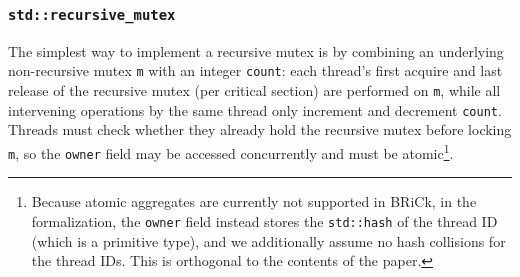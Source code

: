 \subsubsection{\lstinline{std::recursive_mutex}}

The simplest way to implement a recursive mutex is by combining an underlying non-recursive mutex \lstinline{m} with an integer \lstinline{count}: each thread's first acquire and last release of the recursive mutex (per critical section) are performed on \lstinline{m}, while all intervening operations by the same thread only increment and decrement \lstinline{count}. Threads must check whether they already hold the recursive mutex before locking \lstinline{m}, so the \lstinline{owner} field may be accessed concurrently and must be atomic\footnote{Because atomic aggregates are currently not supported in BRiCk, in the formalization, the \lstinline|owner| field instead stores the \lstinline|std::hash| of the thread ID (which is a primitive type), and we additionally assume no hash collisions for the thread IDs. This is orthogonal to the contents of the paper.}.

